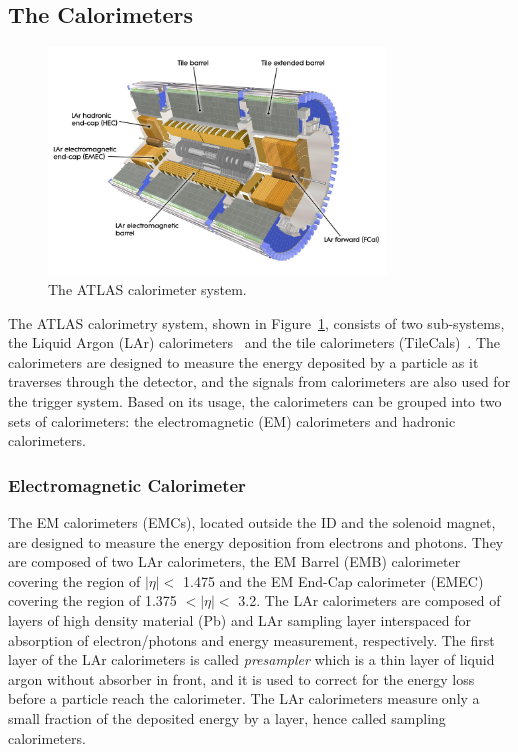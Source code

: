 \subsection{The Calorimeters}
\label{sec:atlas:calorimeter}

\begin{figure}[!htb]
    \includegraphics[width=0.8\textwidth]{figures/calorimeter.jpg}
    \centering
    \caption{The ATLAS calorimeter system.}
    \label{fig:calorimeter}
\end{figure}


The ATLAS calorimetry system, shown in Figure~\ref{fig:calorimeter}, consists of two sub-systems, the Liquid Argon (LAr) calorimeters~\cite{1742-6596-293-1-012044} and the tile calorimeters (TileCals)~\cite{HenriquesCorreia:2004868}. The calorimeters are designed to measure the energy deposited by a particle as it traverses through the detector, and the signals from calorimeters are also used for the trigger system. Based on its usage, the calorimeters can be grouped into two sets of calorimeters: the electromagnetic (EM) calorimeters and hadronic calorimeters.


\subsubsection{Electromagnetic Calorimeter}
\label{sec:atlas:EMcal}
The EM calorimeters (EMCs), located outside the ID and the solenoid magnet, are designed to measure the energy deposition from electrons and photons. They are composed of two LAr calorimeters, the EM Barrel (EMB) calorimeter covering the region of $|\eta|<$ 1.475 and the EM End-Cap calorimeter (EMEC) covering the region of 1.375 $<|\eta|<$ 3.2. The LAr calorimeters are composed of layers of high density material (Pb) and LAr sampling layer interspaced for absorption of electron/photons and energy measurement, respectively. The first layer of the LAr calorimeters is called \textit{presampler} which is a thin layer of liquid argon without absorber in front, and it is used to correct for the energy loss before a particle reach the calorimeter. The LAr calorimeters measure only a small fraction of the deposited energy by a layer, hence called sampling calorimeters.

